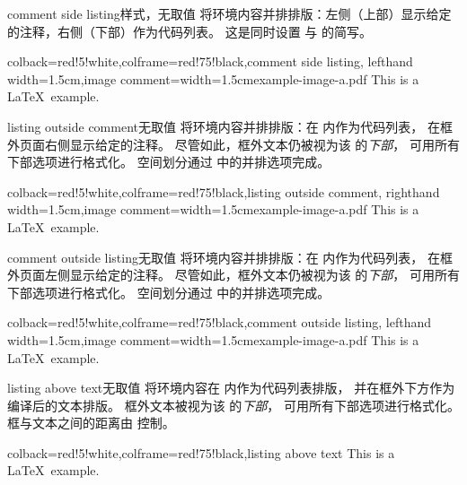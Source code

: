 \begin{docTcbKey}{comment side listing}{}{样式，无取值}
将环境内容并排排版：左侧（上部）显示给定的注释，右侧（下部）作为代码列表。
这是同时设置  与  的简写。
\begin{dispExample}
\begin{tcblisting}{colback=red!5!white,colframe=red!75!black,comment side listing,
  lefthand width=1.5cm,image comment={width=1.5cm}{example-image-a.pdf}}
This is a \LaTeX\ example.
\end{tcblisting}
\end{dispExample}
\end{docTcbKey}

\clearpage

\begin{docTcbKey}{listing outside comment}{}{无取值}
将环境内容并排排版：在  内作为代码列表，
在框外页面右侧显示给定的注释。
尽管如此，框外文本仍被视为该  的\emph{下部}，
可用所有下部选项进行格式化。
空间划分通过  中的并排选项完成。
\begin{dispExample}
\begin{tcblisting}{colback=red!5!white,colframe=red!75!black,listing outside comment,
  righthand width=1.5cm,image comment={width=1.5cm}{example-image-a.pdf}}
This is a \LaTeX\ example.
\end{tcblisting}
\end{dispExample}
\end{docTcbKey}


\begin{docTcbKey}{comment outside listing}{}{无取值}
将环境内容并排排版：在  内作为代码列表，
在框外页面左侧显示给定的注释。
尽管如此，框外文本仍被视为该  的\emph{下部}，
可用所有下部选项进行格式化。
空间划分通过  中的并排选项完成。
\begin{dispExample}
\begin{tcblisting}{colback=red!5!white,colframe=red!75!black,comment outside listing,
  lefthand width=1.5cm,image comment={width=1.5cm}{example-image-a.pdf}}
This is a \LaTeX\ example.
\end{tcblisting}
\end{dispExample}
\end{docTcbKey}



\begin{docTcbKey}{listing above text}{}{无取值}
  将环境内容在  内作为代码列表排版，
  并在框外下方作为编译后的文本排版。
  框外文本被视为该  的\emph{下部}，
  可用所有下部选项进行格式化。
  框与文本之间的距离由  控制。
\begin{dispExample}
\begin{tcblisting}{colback=red!5!white,colframe=red!75!black,listing above text}
This is a \LaTeX\ example.
\end{tcblisting}
\end{dispExample}
\end{docTcbKey}


